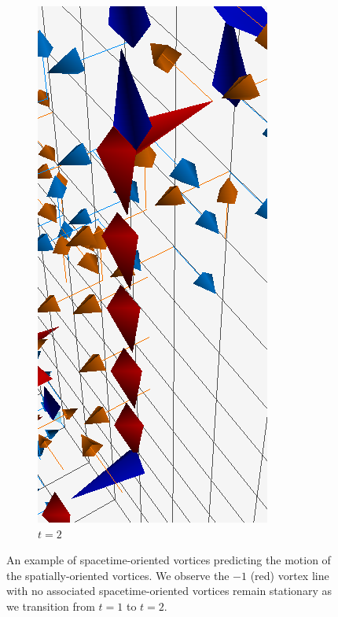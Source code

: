 \begin{figure}[H]
\begin{subfigure}[b]{0.45\textwidth}
\includegraphics[height=0.3\textheight]{./plaqlinet2_line&monopole.png}
\caption{\label{fig:VortexMotion2}$t=2$}
\end{subfigure}
\caption[An example of spacetime-oriented vortices predicting the motion of the spatially-oriented vortices.]{\label{fig:VortexMotion}An example of spacetime-oriented vortices predicting the motion of the spatially-oriented vortices. We observe the $-1$ (red) vortex line with no associated spacetime-oriented vortices remain stationary as we transition from $t=1$ to $t=2$.}
\end{figure}
%

